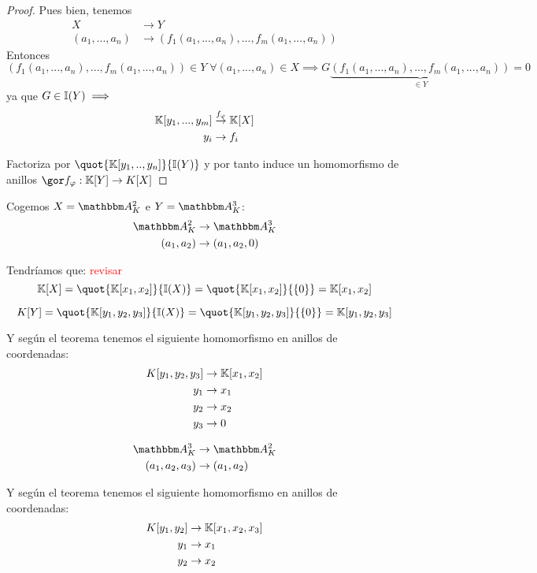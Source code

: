 \begin{proof}
Pues bien, tenemos
\begin{align*}
	X & \rightarrow Y \\
	(a_1,...,a_n) & \rightarrow (f_1(a_1,...,a_n),...,f_m(a_1,...,a_n))
\end{align*} 
Entonces $(f_1(a_1,...,a_n),...,f_m(a_1,...,a_n)) \in Y \; \forall (a_1,...,a_n) \in X \implies G\underbrace{(f_1(a_1,...,a_n),...,f_m(a_1,...,a_n))}_{\in Y}=0$ ya que $G \in \mathbb{I}(Y) \implies $
\begin{align*}
	\mathbb{K}[y_1,...,y_m] & \stackrel{f_{\varphi}}{\rightarrow} \mathbb{K}[X] \\
	y_i & \rightarrow f_i
\end{align*}

Factoriza por $\quot{\K[y_1,..,y_n]}{\I(Y)}$ y por tanto induce un homomorfismo de anillos $\cls{f_{\varphi}}: \K[Y] \rightarrow K[X]$
\end{proof}


\begin{example}
	Cogemos $X=\A_K^2$ e $Y=\A_K^3$:
	\begin{align*}
		\A_K^2 & \rightarrow \A_K^3 \\
		(a_1,a_2) & \rightarrow (a_1,a_2,0)
	\end{align*}
	
	Tendríamos que: \textcolor{red}{revisar} $$\K[X]=\quot{\K[x_1,x_2]}{\I(X)}=\quot{\K[x_1,x_2]}{\{0\}} = \K[x_1,x_2]$$
	
	$$ K[Y]=\quot{\K[y_1,y_2,y_3]}{\I(X)}=\quot{\K[y_1,y_2,y_3]}{\{0\}} = \K[y_1,y_2,y_3] $$
	
	Y según el teorema tenemos el siguiente homomorfismo en anillos de coordenadas:
	\begin{align*}
		K[y_1,y_2,y_3] & \rightarrow \mathbb{K}[x_1,x_2] \\
		y_1 & \rightarrow x_1 \\
		y_2 & \rightarrow x_2 \\
		y_3 & \rightarrow 0 \\
	\end{align*}
\end{example}
	
	
	\begin{example}
		\begin{align*}
			\A_K^3 & \rightarrow \A_K^2 \\
			(a_1,a_2,a_3) & \rightarrow (a_1,a_2)
		\end{align*}
		
		Y según el teorema tenemos el siguiente homomorfismo en anillos de coordenadas:
		\begin{align*}
			K[y_1,y_2] & \rightarrow \mathbb{K}[x_1,x_2,x_3] \\
			y_1 & \rightarrow x_1 \\
			y_2 & \rightarrow x_2 \\
		\end{align*}
	\end{example}
	

